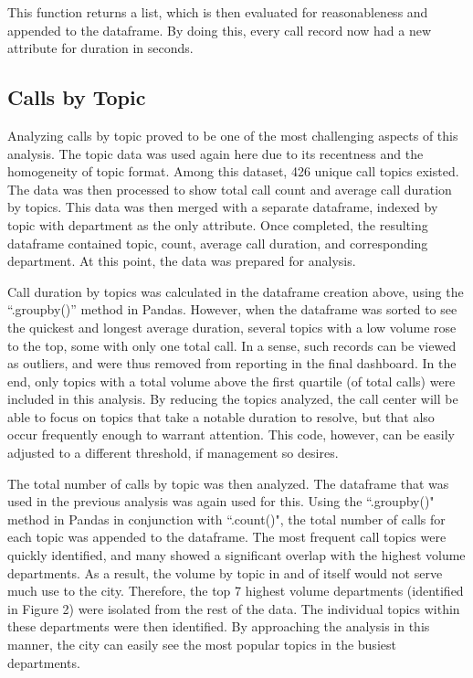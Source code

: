 \documentclass[11pt,twocolumn]{article}
\begin{document}
This function returns a list, which is then evaluated for reasonableness and appended to the dataframe.  By doing this, every call record now had a new attribute for duration in seconds.

	\subsection{Calls by Topic}

Analyzing calls by topic proved to be one of the most challenging aspects of this analysis.  The topic data was used again here due to its recentness and the homogeneity of topic format.  Among this dataset, 426 unique call topics existed.  The data was then processed to show total call count and average call duration by topics.  This data was then merged with a separate dataframe, indexed by topic with department as the only attribute.  Once completed, the resulting dataframe contained topic, count, average call duration, and corresponding department.  At this point, the data was prepared for analysis.
\par
Call duration by topics was calculated in the dataframe creation above, using the ``.groupby()'' method in Pandas.  However, when the dataframe was sorted to see the quickest and longest average duration, several topics with a low volume rose to the top, some with only one total call.  In a sense, such records can be viewed as outliers, and were thus removed from reporting in the final dashboard.  In the end, only topics with a total volume above the first quartile (of total calls) were included in this analysis.  By reducing the topics analyzed, the call center will be able to focus on topics that take a notable duration to resolve, but that also occur frequently enough to warrant attention.  This code, however, can be easily adjusted to a different threshold, if management so desires.
\par
The total number of calls by topic was then analyzed.  The dataframe that was used in the previous analysis was again used for this.  Using the ``.groupby()" method in Pandas in conjunction with ``.count()", the total number of calls for each topic was appended to the dataframe.  The most frequent call topics were quickly identified, and many showed a significant overlap with the highest volume departments.  As a result, the volume by topic in and of itself would not serve much use to the city.  Therefore, the top 7 highest volume departments (identified in Figure 2) were isolated from the rest of the data.  The individual topics within these departments were then identified.  By approaching the analysis in this manner, the city can easily see the most popular topics in the busiest departments.
\end{document}

